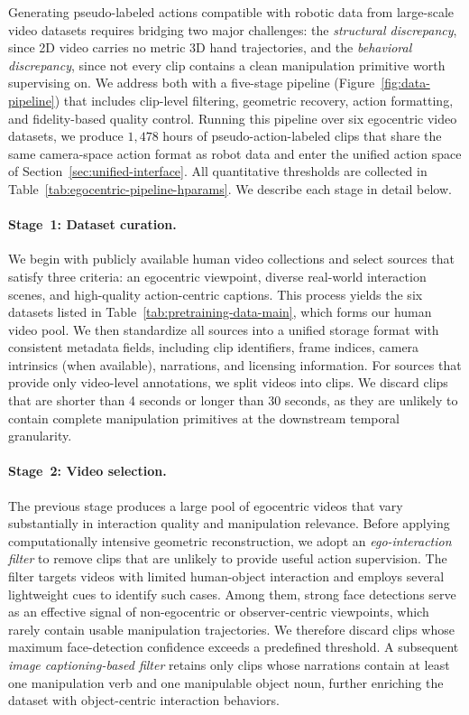 \documentclass{llmxive}
\begin{document}
Generating pseudo-labeled actions compatible with robotic data from large-scale video datasets requires bridging two major challenges: the \textit{structural discrepancy}, since 2D video carries no metric 3D hand trajectories, and the \textit{behavioral discrepancy}, since not every clip contains a clean manipulation primitive worth supervising on. We address both with a five-stage pipeline (Figure~\ref{fig:data-pipeline})
that includes clip-level filtering, geometric recovery, action formatting, and fidelity-based quality control. Running this pipeline over six egocentric video datasets, we produce $1{,}478$ hours of pseudo-action-labeled clips that share the same camera-space action format as robot data and enter the unified action space of Section~\ref{sec:unified-interface}. All quantitative
thresholds are collected in Table~\ref{tab:egocentric-pipeline-hparams}. We describe each stage in detail below.

\paragraph{Stage~1: Dataset curation.}
We begin with publicly available human video collections and select sources that satisfy three criteria: an egocentric viewpoint, diverse real-world interaction scenes, and high-quality action-centric captions. This process yields the six datasets listed in
Table~\ref{tab:pretraining-data-main}, which forms our human video pool. We then standardize all sources into a unified storage format with consistent metadata fields, including clip identifiers, frame indices, camera intrinsics (when available), narrations, and licensing
information. For sources that provide only video-level annotations, we split videos into clips. We discard clips that are shorter than 4 seconds or longer than 30 seconds, as they are unlikely to contain complete manipulation primitives at the downstream temporal granularity.

\paragraph{Stage~2: Video selection.}
The previous stage produces a large pool of egocentric videos that vary substantially in interaction quality and manipulation relevance. Before applying computationally intensive geometric reconstruction, we adopt an
\emph{ego-interaction filter} to remove clips that are unlikely to provide useful action supervision. The filter targets videos with limited human-object interaction and employs several lightweight cues to identify such cases. Among them, strong face detections serve as an effective signal of non-egocentric or observer-centric viewpoints, which rarely contain usable manipulation trajectories. We therefore discard clips whose maximum face-detection confidence exceeds a predefined threshold. 
A subsequent \emph{image captioning-based filter} retains only clips whose narrations contain at least one manipulation verb and one manipulable object noun, further enriching the dataset with object-centric interaction behaviors.
\end{document}
